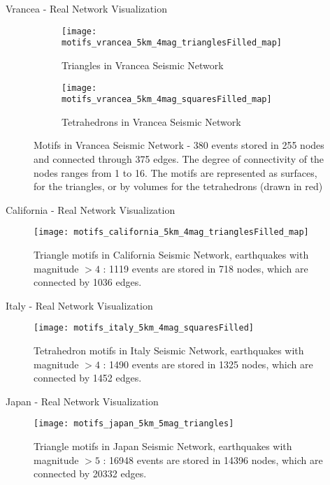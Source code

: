 \begin{frame}{Vrancea - Real Network Visualization}
\begin{figure}[!h]
\begin{subfigure}{.5\textwidth}
  \centering
  \texttt{[image: motifs\_vrancea\_5km\_4mag\_trianglesFilled\_map]}
  \caption{Triangles in Vrancea Seismic Network}
  \label{fig:motifTriangleVrancea}
\end{subfigure}%
\begin{subfigure}{.5\textwidth}
  \centering
  \texttt{[image: motifs\_vrancea\_5km\_4mag\_squaresFilled\_map]}
  \caption{Tetrahedrons in Vrancea Seismic Network}
  \label{fig:motifTetrahedronVrancea}
\end{subfigure}
\caption{Motifs in Vrancea Seismic Network - 380 events stored in 255 nodes and connected through 375 edges. The degree of connectivity of the nodes ranges from 1 to 16. The motifs are represented as surfaces, for the triangles, or by volumes for the tetrahedrons (drawn in red)}
\label{fig:volumesVrancea}
\end{figure}
\end{frame}


\begin{frame}{California - Real Network Visualization}
\begin{figure}[!h]
  \centering
  \texttt{[image: motifs\_california\_5km\_4mag\_trianglesFilled\_map]}
  \caption{Triangle motifs in California Seismic Network, earthquakes with magnitude $>4$ : 1119 events are stored in 718 nodes, which are connected by 1036 edges.}
  \label{fig:motifCalifornia}
\end{figure}
\end{frame}


\begin{frame}{Italy - Real Network Visualization}
\begin{figure}[!h]
  \centering
  \texttt{[image: motifs\_italy\_5km\_4mag\_squaresFilled]}
  \caption{Tetrahedron motifs in Italy Seismic Network, earthquakes with magnitude $>4$ : 1490 events are stored in 1325 nodes, which are connected by 1452 edges.}
  \label{fig:motifItaly}
\end{figure}
\end{frame}


\begin{frame}{Japan - Real Network Visualization}
\begin{figure}[!h]
  \centering
  \texttt{[image: motifs\_japan\_5km\_5mag\_triangles]}
  \caption{Triangle motifs in Japan Seismic Network, earthquakes with magnitude $>5$ : 16948 events are stored in 14396 nodes, which are connected by 20332 edges.}
  \label{fig:motifJapan}
\end{figure}
\end{frame}


